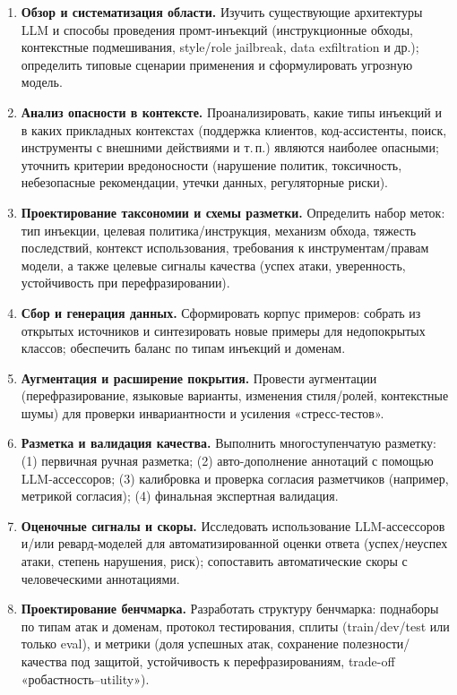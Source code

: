 \begin{enumerate}
  \item \textbf{Обзор и систематизация области.}
    Изучить существующие архитектуры LLM и способы проведения промт-инъекций (инструкционные обходы, контекстные подмешивания, style/role jailbreak, data exfiltration и др.); определить типовые сценарии применения и сформулировать угрозную модель.
  \item \textbf{Анализ опасности в контексте.}
    Проанализировать, какие типы инъекций и в каких прикладных контекстах (поддержка клиентов, код-ассистенты, поиск, инструменты с внешними действиями и т.\,п.) являются наиболее опасными; уточнить критерии вредоносности (нарушение политик, токсичность, небезопасные рекомендации, утечки данных, регуляторные риски).
  \item \textbf{Проектирование таксономии и схемы разметки.}
    Определить набор меток: тип инъекции, целевая политика/инструкция, механизм обхода, тяжесть последствий, контекст использования, требования к инструментам/правам модели, а также целевые сигналы качества (успех атаки, уверенность, устойчивость при перефразировании).
  \item \textbf{Сбор и генерация данных.}
    Сформировать корпус примеров: собрать из открытых источников и синтезировать новые примеры для недопокрытых классов; обеспечить баланс по типам инъекций и доменам.
  \item \textbf{Аугментация и расширение покрытия.}
    Провести аугментации (перефразирование, языковые варианты, изменения стиля/ролей, контекстные шумы) для проверки инвариантности и усиления «стресс-тестов».
  \item \textbf{Разметка и валидация качества.}
    Выполнить многоступенчатую разметку: (1) первичная ручная разметка; (2) авто-дополнение аннотаций с помощью LLM-ассессоров; (3) калибровка и проверка согласия разметчиков (например, метрикой согласия); (4) финальная экспертная валидация.
  \item \textbf{Оценочные сигналы и скоры.}
    Исследовать использование LLM-ассессоров и/или ревард-моделей для автоматизированной оценки ответа (успех/неуспех атаки, степень нарушения, риск); сопоставить автоматические скоры с человеческими аннотациями.
  \item \textbf{Проектирование бенчмарка.}
    Разработать структуру бенчмарка: поднаборы по типам атак и доменам, протокол тестирования, сплиты (train/dev/test или только eval), и метрики (доля успешных атак, сохранение полезности/качества под защитой, устойчивость к перефразированиям, trade-off «робастность–utility»).

\end{enumerate}
